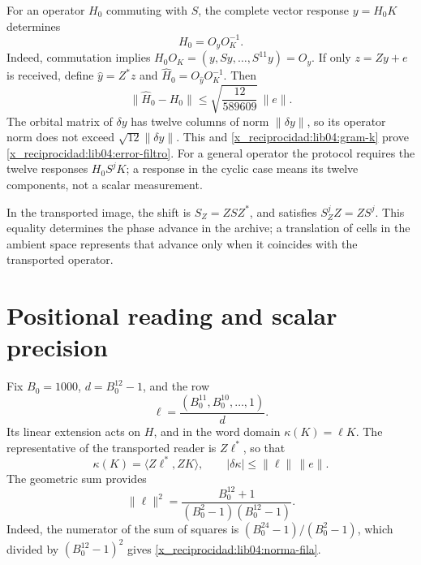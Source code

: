 For an operator \(H_0\) commuting with \(S\), the complete
vector response \(y=H_0K\) determines
\begin{equation}
 H_0=O_yO_K^{-1}.
 \label{x_reciprocidad:lib04:identificacion-filtro}
\end{equation}
Indeed, commutation implies
\(H_0O_K=(y,Sy,\ldots,S^{11}y)=O_y\). If only
\(z=Zy+e\) is received, define \(\widehat y=Z^*z\) and
\(\widehat H_0=O_{\widehat y}O_K^{-1}\). Then
\begin{equation}
 \|\widehat H_0-H_0\|
 \leq\sqrt{\frac{12}{589609}}\,\|e\|.
 \label{x_reciprocidad:lib04:error-filtro}
\end{equation}
The orbital matrix of \(\delta y\) has twelve columns of norm
\(\|\delta y\|\), so its operator norm does not exceed
\(\sqrt{12}\|\delta y\|\). This and
\eqref{x_reciprocidad:lib04:gram-k} prove \eqref{x_reciprocidad:lib04:error-filtro}.
For a general operator the protocol requires the twelve responses
\(H_0S^jK\); a response in the cyclic case means its twelve
components, not a scalar measurement.

In the transported image, the shift is
\(S_Z=ZSZ^*\), and satisfies \(S_Z^jZ=ZS^j\). This equality
determines the phase advance in the archive; a translation of cells
in the ambient space represents that advance only when it coincides with
the transported operator.

\section{Positional reading and scalar precision}
\label{x_reciprocidad:lib04:kappa}

Fix \(B_0=1000\), \(d=B_0^{12}-1\), and the row
\begin{equation}
 \ell=\frac{(B_0^{11},B_0^{10},\ldots,1)}{d}.
 \label{x_reciprocidad:lib04:fila-posicional}
\end{equation}
Its linear extension acts on \(H\), and in the word domain
\(\kappa(K)=\ell K\). The representative of the transported reader is
\(Z\ell^*\), so that
\begin{equation}
 \kappa(K)=\langle Z\ell^*,ZK\rangle,\qquad
 |\delta\kappa|\leq\|\ell\|\,\|e\|.
 \label{x_reciprocidad:lib04:lectura-kappa}
\end{equation}
The geometric sum provides
\begin{equation}
 \|\ell\|^2
 =\frac{B_0^{12}+1}{(B_0^2-1)(B_0^{12}-1)}.
 \label{x_reciprocidad:lib04:norma-fila}
\end{equation}
Indeed, the numerator of the sum of squares is
\((B_0^{24}-1)/(B_0^2-1)\), which divided by
\((B_0^{12}-1)^2\) gives \eqref{x_reciprocidad:lib04:norma-fila}.

